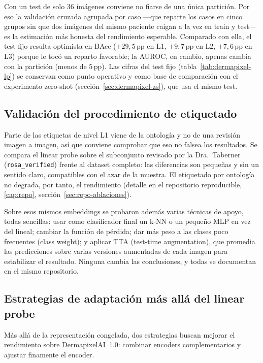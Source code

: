 Con un test de solo $36$ imágenes conviene no fiarse de una única
partición. Por eso la validación cruzada agrupada por caso ---que
reparte los casos en cinco grupos sin que dos imágenes del mismo
paciente caigan a la vez en train y test--- es la
estimación más honesta del rendimiento esperable. Comparado con ella,
el test fijo resulta optimista en BAcc ($+29{,}5$\,pp en L1,
$+9{,}7$\,pp en L2, $+7{,}6$\,pp en L3) porque le tocó un reparto
favorable; la AUROC, en cambio, apenas cambia con la partición (menos
de $5$\,pp). Las cifras del test fijo (tabla~\ref{tab:dermapixel-lp})
se conservan como punto operativo y como base de comparación con el
experimento zero-shot (sección~\ref{sec:dermapixel-zs}), que usa
el mismo test.


\subsection{Validación del procedimiento de etiquetado}

Parte de las etiquetas de nivel L1 viene de la ontología y no de una
revisión imagen a imagen, así que conviene comprobar que eso no falsea
los resultados. Se compara el linear probe sobre el subconjunto
revisado por la Dra.~Taberner (\texttt{rosa\_verified}) frente al
dataset completo: las diferencias son pequeñas y sin un sentido claro,
compatibles con el azar de la muestra. El etiquetado por ontología no
degrada, por tanto, el rendimiento (detalle en el repositorio
reproducible, \ref{cap:repo}, sección~\ref{sec:repo-ablaciones}).

Sobre esos mismos embeddings se probaron además varias técnicas de
apoyo, todas sencillas: usar como clasificador final un k-NN o un
pequeño MLP en vez del lineal; cambiar la función de pérdida; dar más
peso a las clases poco frecuentes (class weight); y aplicar TTA
(test-time augmentation), que promedia las predicciones sobre varias
versiones aumentadas de cada imagen para estabilizar el resultado.
Ninguna cambia las conclusiones, y todas se documentan en el mismo
repositorio.


\subsection{Estrategias de adaptación más allá del linear probe}
\label{sec:dermapixel-ensemble}

Más allá de la representación congelada, dos estrategias buscan mejorar
el rendimiento sobre DermapixelAI~1.0: combinar encoders
complementarios y ajustar finamente el encoder.

